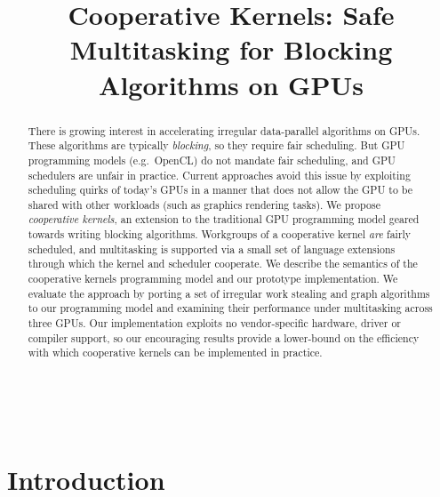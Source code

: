 \documentclass[numbers,nocopyrightspace,10pt]{sigplanconf}
\begin{document}
\title{Cooperative Kernels: Safe Multitasking for Blocking Algorithms on GPUs}

%
%

\authorinfo{}
{\makebox{} \\
}
{}




\maketitle

\vspace{-3mm}
\begin{abstract}
There is growing interest in accelerating irregular data-parallel
algorithms on GPUs.  These algorithms are typically \emph{blocking},
so they require fair scheduling.  But GPU programming models (e.g.\ OpenCL)
do not mandate fair scheduling, and GPU schedulers are
unfair in practice.  Current approaches avoid this issue by exploiting
scheduling quirks of today's GPUs in a manner that does not
allow the GPU to be shared with other workloads (such as graphics
rendering tasks).  We propose \emph{cooperative kernels}, an extension
to the traditional GPU programming model geared towards writing
blocking algorithms.  Workgroups of a cooperative kernel \emph{are}
fairly scheduled, and multitasking is supported via a small set of
language extensions through which the kernel and scheduler cooperate.
We describe the semantics of the cooperative kernels programming model
and our prototype implementation.  We evaluate the approach by porting
a set of irregular work stealing and graph algorithms to our
programming model and examining their performance under multitasking
across three GPUs.  Our implementation exploits no
vendor-specific hardware, driver or compiler support, so our encouraging
results provide a lower-bound on the efficiency with
which cooperative kernels can be implemented in practice.

\end{abstract}
    
\section{Introduction}\label{sec:intro}
\end{document}
